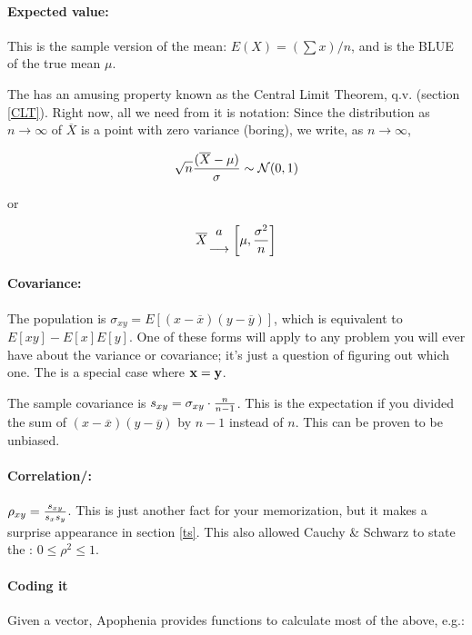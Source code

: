 \paragraph{Expected value:} This is the sample version of the mean:
$E(X)=(\sum x)/n$, and is the BLUE of the true mean
$\mu$.

The  has an amusing property known as the Central Limit
Theorem, q.v. (section \ref{CLT}). Right now, all we need from it is
notation: Since the distribution as $n\to\infty$ of $\overline X$ is a
point with zero variance (boring), we write, as $n\to\infty$,

$$\sqrt{n} {(\overline X - \mu)\over\sigma} \sim {\cal N}(0,1)$$

or

$$\overline X {a \atop \longrightarrow} \left[\mu,{\sigma^2\over n}\right]$$

\paragraph{Covariance:} The population  is $\sigma_{xy} =
E[(x-\overline x)(y-\overline y)]$, which is equivalent to
$E[xy]-E[x]E[y]$. One of these forms will apply to any problem you will
ever have about the variance or covariance; it's just a question of
figuring out which one. The  is a special case where ${\bf x}={\bf y}$.

The sample covariance is $s_{xy}=\sigma_{xy}\cdot {n\over n-1}$. This
is
the expectation if you  divided the sum of $(x-\overline
x)(y-\overline y)$ by $n-1$ instead of $n$. This
can be proven to be unbiased.

\paragraph{Correlation/:} $\rho_{xy}={s_{xy}\over s_x
s_y}$. This is just another fact for your memorization, but it makes a
surprise appearance in section \ref{ts}. This also allowed Cauchy \&
Schwarz to state the : $0\leq \rho^2 \leq 1$.
\label{correlation}

\paragraph{Coding it} Given a vector, Apophenia provides functions to
calculate most of the above, e.g.:

